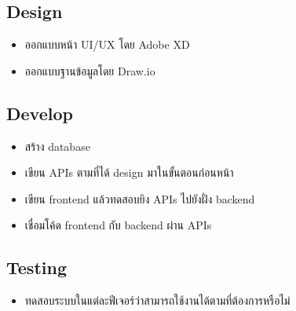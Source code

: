 \subsection{Design}
\begin{itemize}
  \item ออกแบบหน้า UI/UX โดย Adobe XD
  \item ออกแบบฐานข้อมูลโดย Draw.io
\end{itemize}

\subsection{Develop}
\begin{itemize}
  \item สร้าง database
  \item เขียน APIs ตามที่ได้ design มาในขั้นตอนก่อนหน้า
  \item เขียน frontend แล้วทดสอบยิง APIs ไปยังฝั่ง backend
  \item เชื่อมโค้ด frontend กับ backend ผ่าน APIs
\end{itemize}

\subsection{Testing}
\begin{itemize}
  \item ทดสอบระบบในแต่ละฟีเจอร์ว่าสามารถใช้งานได้ตามที่ต้องการหรือไม่
\end{itemize}
